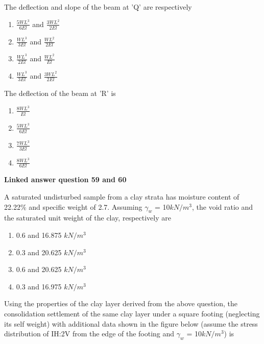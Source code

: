 \item The deflection and slope of the beam at 'Q' are respectively 
\begin{enumerate}
    \item $\frac{5WL^{3}}{6El}$ and $\frac{3WL^{2}}{2El}$
        \item $\frac{WL^{3}}{3El}$ and $\frac{WL^{2}}{2El}$
    \item $\frac{WL^{3}}{2El}$ and $\frac{WL^{2}}{El}$
    \item $\frac{WL^{3}}{3El}$ and $\frac{3WL^{2}}{2El}$        
\end{enumerate}
\item The deflection of the beam at 'R' is
\begin{enumerate}
    \item $\frac{8WL^{3}}{El}$
        \item $\frac{5WL^{3}}{6El}$
    \item $\frac{7WL^{3}}{3El}$
    \item $\frac{8WL^{3}}{6El}$ \\
\end{enumerate}
\textbf{Linked answer question 59 and 60} 
\item A saturated undisturbed sample from a clay strata has moisture content of 22.22\% and specific weight of 2.7. Assuming $\gamma_{w}$ = 10$kN/m^{3}$, the void ratio and the saturated unit weight of the clay, respectively are
\begin{enumerate}
    \item 0.6 and 16.875 $kN/m^{3}$
        \item 0.3 and 20.625 $kN/m^{3}$
    \item 0.6 and 20.625 $kN/m^{3}$
    \item 0.3 and 16.975 $kN/m^{3}$
\end{enumerate}
\item Using the properties of the clay layer derived from the above question, the consolidation settlement of the same clay layer under a square footing (neglecting its self weight) with additional data shown in the figure below (assume the stress distribution of IH:2V from the edge of the footing and $\gamma_{w}$ = 10$kN/m^{3}$) is 

